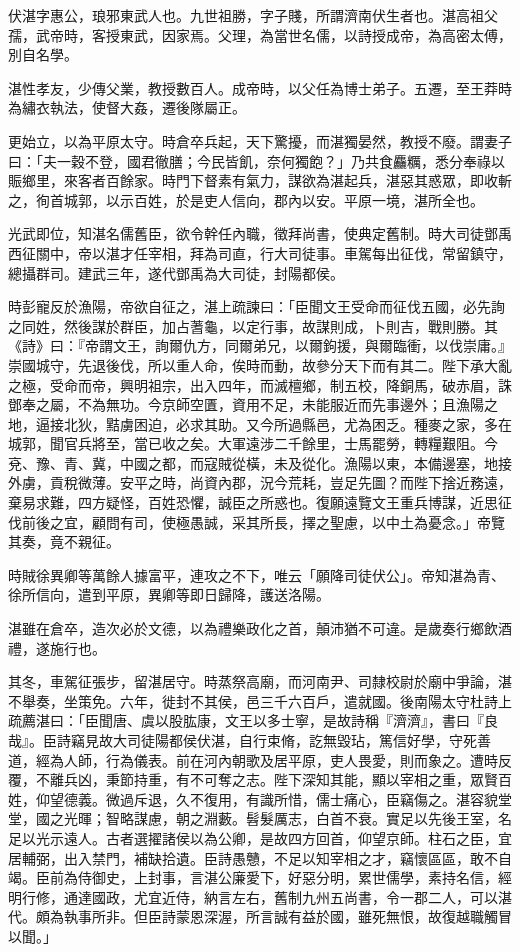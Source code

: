 
\begin{pinyinscope}
伏湛字惠公，琅邪東武人也。九世祖勝，字子賤，所謂濟南伏生者也。湛高祖父孺，武帝時，客授東武，因家焉。父理，為當世名儒，以詩授成帝，為高密太傅，別自名學。

湛性孝友，少傳父業，教授數百人。成帝時，以父任為博士弟子。五遷，至王莽時為繡衣執法，使督大姦，遷後隊屬正。

更始立，以為平原太守。時倉卒兵起，天下驚擾，而湛獨晏然，教授不廢。謂妻子曰：「夫一穀不登，國君徹膳；今民皆飢，奈何獨飽？」乃共食麤糲，悉分奉祿以賑鄉里，來客者百餘家。時門下督素有氣力，謀欲為湛起兵，湛惡其惑眾，即收斬之，徇首城郭，以示百姓，於是吏人信向，郡內以安。平原一境，湛所全也。

光武即位，知湛名儒舊臣，欲令幹任內職，徵拜尚書，使典定舊制。時大司徒鄧禹西征關中，帝以湛才任宰相，拜為司直，行大司徒事。車駕每出征伐，常留鎮守，總攝群司。建武三年，遂代鄧禹為大司徒，封陽都侯。

時彭寵反於漁陽，帝欲自征之，湛上疏諫曰：「臣聞文王受命而征伐五國，必先詢之同姓，然後謀於群臣，加占蓍龜，以定行事，故謀則成，卜則吉，戰則勝。其《詩》曰：『帝謂文王，詢爾仇方，同爾弟兄，以爾鉤援，與爾臨衝，以伐崇庸。』崇國城守，先退後伐，所以重人命，俟時而動，故參分天下而有其二。陛下承大亂之極，受命而帝，興明祖宗，出入四年，而滅檀鄉，制五校，降銅馬，破赤眉，誅鄧奉之屬，不為無功。今京師空匱，資用不足，未能服近而先事邊外；且漁陽之地，逼接北狄，黠虜困迫，必求其助。又今所過縣邑，尤為困乏。種麥之家，多在城郭，聞官兵將至，當已收之矣。大軍遠涉二千餘里，士馬罷勞，轉糧艱阻。今兗、豫、青、冀，中國之都，而寇賊從橫，未及從化。漁陽以東，本備邊塞，地接外虜，貢稅微薄。安平之時，尚資內郡，況今荒耗，豈足先圖？而陛下捨近務遠，棄易求難，四方疑怪，百姓恐懼，誠臣之所惑也。復願遠覽文王重兵博謀，近思征伐前後之宜，顧問有司，使極愚誠，采其所長，擇之聖慮，以中土為憂念。」帝覽其奏，竟不親征。

時賊徐異卿等萬餘人據富平，連攻之不下，唯云「願降司徒伏公」。帝知湛為青、徐所信向，遣到平原，異卿等即日歸降，護送洛陽。

湛雖在倉卒，造次必於文德，以為禮樂政化之首，顛沛猶不可違。是歲奏行鄉飲酒禮，遂施行也。

其冬，車駕征張步，留湛居守。時蒸祭高廟，而河南尹、司隸校尉於廟中爭論，湛不舉奏，坐策免。六年，徙封不其侯，邑三千六百戶，遣就國。後南陽太守杜詩上疏薦湛曰：「臣聞唐、虞以股肱康，文王以多士寧，是故詩稱『濟濟』，書曰『良哉』。臣詩竊見故大司徒陽都侯伏湛，自行束脩，訖無毀玷，篤信好學，守死善道，經為人師，行為儀表。前在河內朝歌及居平原，吏人畏愛，則而象之。遭時反覆，不離兵凶，秉節持重，有不可奪之志。陛下深知其能，顯以宰相之重，眾賢百姓，仰望德義。微過斥退，久不復用，有識所惜，儒士痛心，臣竊傷之。湛容貌堂堂，國之光暉；智略謀慮，朝之淵藪。髫髮厲志，白首不衰。實足以先後王室，名足以光示遠人。古者選擢諸侯以為公卿，是故四方回首，仰望京師。柱石之臣，宜居輔弼，出入禁門，補缺拾遺。臣詩愚戇，不足以知宰相之才，竊懷區區，敢不自竭。臣前為侍御史，上封事，言湛公廉愛下，好惡分明，累世儒學，素持名信，經明行修，通達國政，尤宜近侍，納言左右，舊制九州五尚書，令一郡二人，可以湛代。頗為執事所非。但臣詩蒙恩深渥，所言誠有益於國，雖死無恨，故復越職觸冒以聞。」


\end{pinyinscope}
